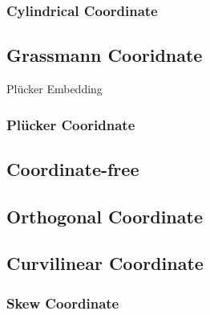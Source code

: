 \subsubsection{Cylindrical Coordinate}\label{sec:cylindrical_coordinate}



\subsection{Grassmann Cooridnate}\label{sec:grassmann_coordinate}

Pl\"ucker Embedding



\subsubsection{Pl\"ucker Cooridnate}\label{sec:plucker_coordinate}



\subsection{Coordinate-free}\label{sec:coordinate_free}

\subsection{Orthogonal Coordinate}\label{sec:orthogonal_coordinate}

\subsection{Curvilinear Coordinate}\label{sec:curvilinear_coordinate}

\subsubsection{Skew Coordinate}\label{sec:skew_coordinate}



